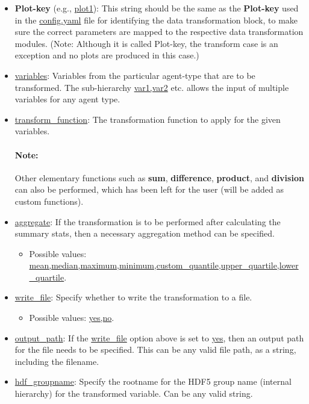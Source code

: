 \documentclass[10pt,a4paper]{article}
\begin{document}
\begin{itemize}
\item \textbf{Plot-key} (e.g., \url{plot1}): This string should be the same as the \textbf{Plot-key} used in the \url{config.yaml} file for identifying the data transformation block, to make sure the correct parameters are mapped to the respective data transformation modules.
(Note: Although it is called Plot-key, the transform case is an exception and no plots are produced in this case.)

\item \url{variables}: Variables from the particular agent-type that are to be transformed. The sub-hierarchy \url{var1,var2} etc. allows
the input of multiple variables for any agent type. 

\item \url{transform_function}: The transformation function to apply for the given variables.

\paragraph{Note:} Other elementary functions such as \textbf{sum}, \textbf{difference}, \textbf{product}, and \textbf{division} can also be performed, which has been left for the user (will be added as custom functions).

\item \url{aggregate}: If the transformation is to be performed after calculating the summary stats, then a necessary aggregation method can be specified.
\begin{itemize}
\item Possible values: \url{mean,median,maximum,minimum,custom_quantile,upper_quartile,lower_quartile}.
\end{itemize}

\item \url{write_file}: Specify whether to write the transformation to a file.
\begin{itemize}
\item Possible values: \url{yes,no}.
\end{itemize}

\item \url{output_path}: If the \url{write_file} option above is set to \url{yes}, then an output path for the file needs to be specified.
This can be any valid file path, as a string, including the filename.

\item \url{hdf_groupname}: Specify the rootname for the HDF5 group name (internal hierarchy) for the transformed variable. Can be any valid string.
\end{itemize}
\end{document}
